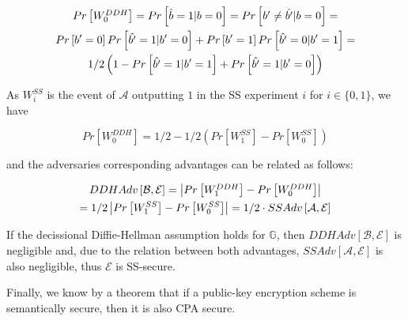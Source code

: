 \documentclass{article}
\begin{document}
\begin{multline*}
$$
  Pr\left[W_0^{DDH}\right] = 
  Pr\left[ \hat{b} = 1 | b = 0 \right] =
  Pr\left[ b' \neq \hat{b'} | b = 0 \right] = \\ 
  Pr\left[ b' = 0 \right] Pr \left[ \hat{b'} = 1 | b' = 0 \right] +
    Pr\left[ b' = 1 \right] Pr \left[ \hat{b'} = 0 | b' = 1 \right] = \\ 
  1/2 \left(1 -
    Pr \left[ \hat{b'} = 1 | b' = 1 \right] +
    Pr \left[ \hat{b'} = 1 | b' = 0 \right]
  \right)
$$
\end{multline*}

As $W_i^{SS}$ is the event of $\mathcal{A}$
outputting $1$ in the SS experiment $i$ for $i \in \{0,1\}$,
we have 

$$
  Pr\left[W_0^{DDH}\right] =
  1/2 - 1/2 \left( Pr\left[W_1^{SS} \right] 
    - Pr\left[W_0^{SS}\right]\right)
$$

and the adversaries corresponding advantages can be related as follows:

\begin{multline*}
$$
  DDHAdv\left[\mathcal{B}, \mathcal{E}\right] =
    \left|Pr\left[W_1^{DDH}\right] - Pr\left[W_0^{DDH}\right]\right| \\ =
    1\slash2 \left|Pr\left[W_1^{SS}\right] - Pr\left[W_0^{SS}\right]\right| =
    1\slash2 \cdot SSAdv\left[\mathcal{A}, \mathcal{E}\right]
$$
\end{multline*}

If the decissional Diffie-Hellman assumption holds for 
$\mathbb{G}$, then 
$DDHAdv\left[\mathcal{B}, \mathcal{E}\right]$ is negligible 
and, due to the relation between both advantages, 
$SSAdv\left[\mathcal{A}, \mathcal{E}\right]$ is also negligible,
thus $\mathcal{E}$ is SS-secure.

Finally, we know by a theorem that if a public-key encryption scheme is
semantically secure, then it is also CPA secure.
\end{document}
